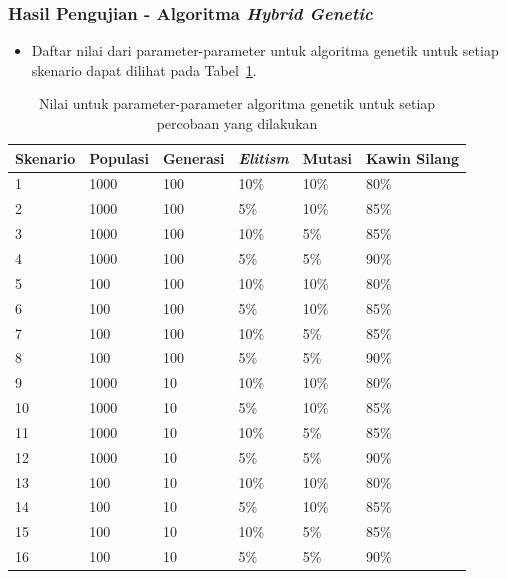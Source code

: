 \documentclass{beamer}
\begin{document}
\begin{frame}
\frametitle{Hasil Pengujian - Algoritma \textit{Hybrid Genetic}}
\begin{itemize}
\item Daftar nilai dari parameter-parameter untuk algoritma genetik untuk setiap skenario dapat dilihat pada Tabel~\ref{tab:nilaiparameterhg}.
\end{itemize}
\begin{table}
\tiny
\centering
\captionsetup{justification=centering}
\caption[Nilai untuk parameter-parameter algoritma genetik untuk setiap percobaan yang dilakukan]{Nilai untuk parameter-parameter algoritma genetik untuk setiap percobaan yang dilakukan}
\begin{tabular}{| l | l | l | l | l | l |}
\hline
Skenario & Populasi & Generasi & \textit{Elitism} & Mutasi & Kawin Silang \\
\hline \hline
1 & 1000 & 100 & 10\% & 10\% & 80\% \\
\hline
2 & 1000 & 100 & 5\% & 10\% & 85\% \\
\hline
3 & 1000 & 100 & 10\% & 5\% & 85\% \\
\hline
4 & 1000 & 100 & 5\% & 5\% & 90\% \\
\hline
5 & 100 & 100 & 10\% & 10\% & 80\% \\
\hline
6 & 100 & 100 & 5\% & 10\% & 85\% \\
\hline
7 & 100 & 100 & 10\% & 5\% & 85\% \\
\hline
8 & 100 & 100 & 5\% & 5\% & 90\% \\
\hline
9 & 1000 & 10 & 10\% & 10\% & 80\% \\
\hline
10 & 1000 & 10 & 5\% & 10\% & 85\% \\
\hline
11 & 1000 & 10 & 10\% & 5\% & 85\% \\
\hline
12 & 1000 & 10 & 5\% & 5\% & 90\% \\
\hline
13 & 100 & 10 & 10\% & 10\% & 80\% \\
\hline
14 & 100 & 10 & 5\% & 10\% & 85\% \\
\hline
15 & 100 & 10 & 10\% & 5\% & 85\% \\
\hline
16 & 100 & 10 & 5\% & 5\% & 90\% \\
\hline
\end{tabular}
\label{tab:nilaiparameterhg}
\end{table}

\end{frame}

\end{document}
